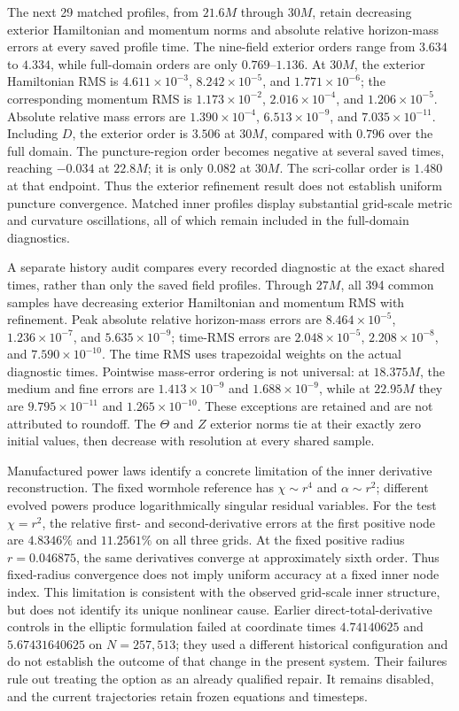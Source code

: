 \documentclass[11pt]{article}
\begin{document}
The next 29 matched profiles, from $21.6M$ through $30M$, retain decreasing exterior Hamiltonian and momentum norms and absolute relative horizon-mass errors at every saved profile time. The nine-field exterior orders range from $3.634$ to $4.334$, while full-domain orders are only $0.769$--$1.136$. At $30M$, the exterior Hamiltonian RMS is $4.611\times10^{-3}$, $8.242\times10^{-5}$, and $1.771\times10^{-6}$; the corresponding momentum RMS is $1.173\times10^{-2}$, $2.016\times10^{-4}$, and $1.206\times10^{-5}$. Absolute relative mass errors are $1.390\times10^{-4}$, $6.513\times10^{-9}$, and $7.035\times10^{-11}$. Including $D$, the exterior order is $3.506$ at $30M$, compared with $0.796$ over the full domain. The puncture-region order becomes negative at several saved times, reaching $-0.034$ at $22.8M$; it is only $0.082$ at $30M$. The scri-collar order is $1.480$ at that endpoint. Thus the exterior refinement result does not establish uniform puncture convergence. Matched inner profiles display substantial grid-scale metric and curvature oscillations, all of which remain included in the full-domain diagnostics.

A separate history audit compares every recorded diagnostic at the exact shared times, rather than only the saved field profiles. Through $27M$, all 394 common samples have decreasing exterior Hamiltonian and momentum RMS with refinement. Peak absolute relative horizon-mass errors are $8.464\times10^{-5}$, $1.236\times10^{-7}$, and $5.635\times10^{-9}$; time-RMS errors are $2.048\times10^{-5}$, $2.208\times10^{-8}$, and $7.590\times10^{-10}$. The time RMS uses trapezoidal weights on the actual diagnostic times. Pointwise mass-error ordering is not universal: at $18.375M$, the medium and fine errors are $1.413\times10^{-9}$ and $1.688\times10^{-9}$, while at $22.95M$ they are $9.795\times10^{-11}$ and $1.265\times10^{-10}$. These exceptions are retained and are not attributed to roundoff. The $\Theta$ and $Z$ exterior norms tie at their exactly zero initial values, then decrease with resolution at every shared sample.

Manufactured power laws identify a concrete limitation of the inner derivative reconstruction. The fixed wormhole reference has $\chi\sim r^4$ and $\alpha\sim r^2$; different evolved powers produce logarithmically singular residual variables. For the test $\chi=r^2$, the relative first- and second-derivative errors at the first positive node are $4.8346\%$ and $11.2561\%$ on all three grids. At the fixed positive radius $r=0.046875$, the same derivatives converge at approximately sixth order. Thus fixed-radius convergence does not imply uniform accuracy at a fixed inner node index. This limitation is consistent with the observed grid-scale inner structure, but does not identify its unique nonlinear cause. Earlier direct-total-derivative controls in the elliptic formulation failed at coordinate times $4.74140625$ and $5.67431640625$ on $N=257,513$; they used a different historical configuration and do not establish the outcome of that change in the present system. Their failures rule out treating the option as an already qualified repair. It remains disabled, and the current trajectories retain frozen equations and timesteps.
\end{document}
